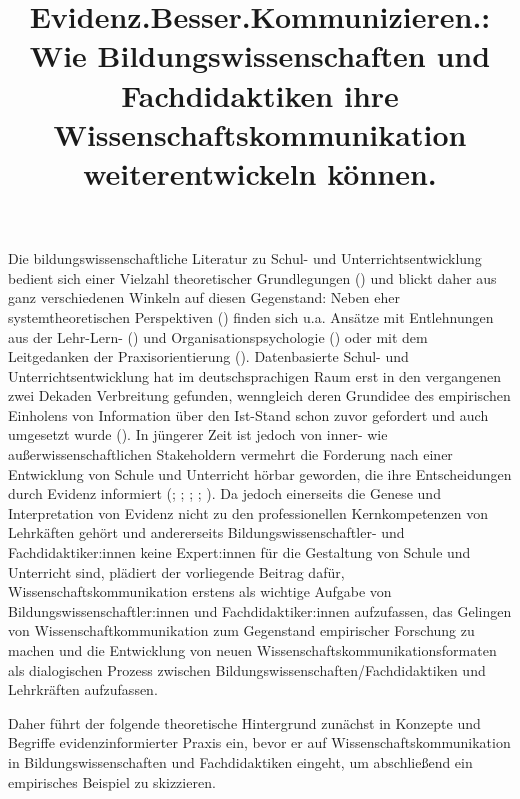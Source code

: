 \documentclass[
  jou,
  floatsintext,
  longtable,
  nolmodern,
  notxfonts,
  notimes,
  colorlinks=true,linkcolor=blue,citecolor=blue,urlcolor=blue]{apa7}
\title{Evidenz.Besser.Kommunizieren.: Wie Bildungswissenschaften und
Fachdidaktiken ihre Wissenschaftskommunikation weiterentwickeln können.}
\begin{document}
\maketitle


\setcounter{secnumdepth}{-\maxdimen} %

\setlength\LTleft{0pt}


Die bildungswissenschaftliche Literatur zu Schul- und
Unterrichtsentwicklung bedient sich einer Vielzahl theoretischer
Grundlegungen () und blickt daher aus
ganz verschiedenen Winkeln auf diesen Gegenstand: Neben eher
systemtheoretischen Perspektiven () finden sich u.a. Ansätze mit Entlehnungen aus der
Lehr-Lern- () und
Organisationspsychologie () oder mit dem Leitgedanken der Praxisorientierung
(). Datenbasierte Schul-
und Unterrichtsentwicklung hat im deutschsprachigen Raum erst in den
vergangenen zwei Dekaden Verbreitung gefunden, wenngleich deren
Grundidee des empirischen Einholens von Information über den Ist-Stand
schon zuvor gefordert und auch umgesetzt wurde
(). In jüngerer
Zeit ist jedoch von inner- wie außerwissenschaftlichen Stakeholdern
vermehrt die Forderung nach einer Entwicklung von Schule und Unterricht
hörbar geworden, die ihre Entscheidungen durch Evidenz informiert
(; ; ; ;
). Da jedoch einerseits die Genese
und Interpretation von Evidenz nicht zu den professionellen
Kernkompetenzen von Lehrkäften gehört und andererseits
Bildungswissenschaftler- und Fachdidaktiker:innen keine Expert:innen für
die Gestaltung von Schule und Unterricht sind, plädiert der vorliegende
Beitrag dafür, Wissenschaftskommunikation erstens als wichtige Aufgabe
von Bildungswissenschaftler:innen und Fachdidaktiker:innen aufzufassen,
das Gelingen von Wissenschaftkommunikation zum Gegenstand empirischer
Forschung zu machen und die Entwicklung von neuen
Wissenschaftskommunikationsformaten als dialogischen Prozess zwischen
Bildungswissenschaften/Fachdidaktiken und Lehrkräften aufzufassen.

Daher führt der folgende theoretische Hintergrund zunächst in Konzepte
und Begriffe evidenzinformierter Praxis ein, bevor er auf
Wissenschaftskommunikation in Bildungswissenschaften und Fachdidaktiken
eingeht, um abschließend ein empirisches Beispiel zu skizzieren.
\end{document}
